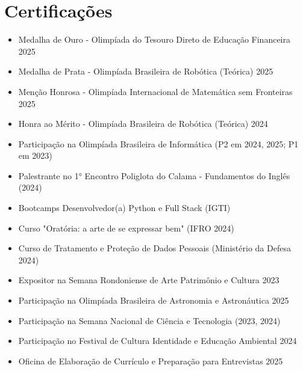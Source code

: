 \documentclass[a4paper,10pt]{article}
\begin{document}
\section{Certificações}
    \begin{itemize}
        \item Medalha de Ouro - Olimpíada do Tesouro Direto de Educação Financeira 2025
        \item Medalha de Prata - Olimpíada Brasileira de Robótica (Teórica) 2025
        \item Menção Honrosa - Olimpíada Internacional de Matemática sem Fronteiras 2025
        \item Honra ao Mérito - Olimpíada Brasileira de Robótica (Teórica) 2024
        \item Participação na Olimpíada Brasileira de Informática (P2 em 2024, 2025; P1 em 2023)
        \item Palestrante no 1° Encontro Poliglota do Calama - Fundamentos do Inglês (2024)
        \item Bootcamps Desenvolvedor(a) Python e Full Stack (IGTI)
        \item Curso "Oratória: a arte de se expressar bem" (IFRO 2024)
        \item Curso de Tratamento e Proteção de Dados Pessoais (Ministério da Defesa 2024)
        \item Expositor na Semana Rondoniense de Arte Patrimônio e Cultura 2023
        \item Participação na Olimpíada Brasileira de Astronomia e Astronáutica 2025
        \item Participação na Semana Nacional de Ciência e Tecnologia (2023, 2024)
        \item Participação no Festival de Cultura Identidade e Educação Ambiental 2024
        \item Oficina de Elaboração de Currículo e Preparação para Entrevistas 2025
    \end{itemize}
\end{document}
